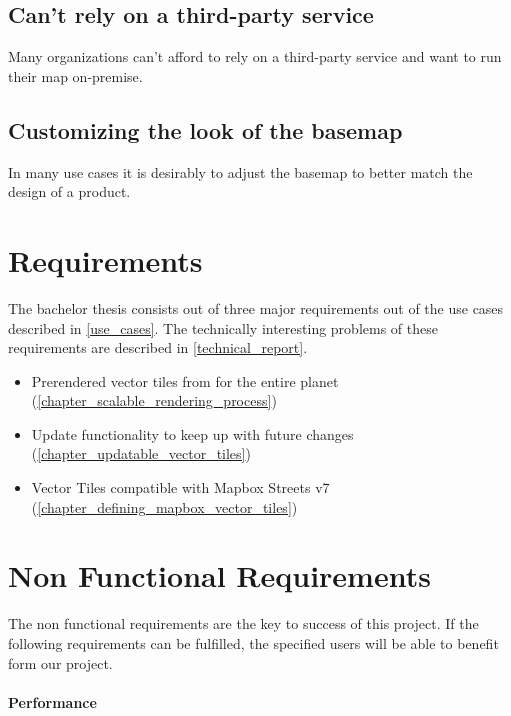 \subsection{Can't rely on a third-party service}

Many organizations can't afford to rely on a third-party service and want to run their map on-premise.

\subsection{Customizing the look of the basemap}

In many use cases it is desirably to adjust the basemap to better match the design of a product.

\section{Requirements}\label{requirements}

The bachelor thesis consists out of three major requirements out of the use cases described in \autoref{use_cases}. The technically interesting problems of these requirements are described in \autoref{technical_report}.

\begin{itemize}
    \item Prerendered vector tiles from \osm{} for the entire planet (\autoref{chapter_scalable_rendering_process})
    \item Update functionality to keep up with future \osm{} changes (\autoref{chapter_updatable_vector_tiles})
    \item Vector Tiles compatible with Mapbox Streets v7 (\autoref{chapter_defining_mapbox_vector_tiles})
\end{itemize}


\section{Non Functional Requirements}\label{non_functional_requirements}

The non functional requirements are the key to success of this project. If the following requirements can be fulfilled, the specified users will be able to benefit form our project.

\paragraph{Performance}


